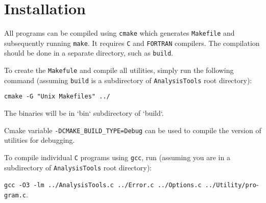 \chapter{Installation} \label{chap:Install}

All programs can be compiled using \texttt{cmake} which generates
\texttt{Makefile} and subsequently running \texttt{make}. It requires
\texttt{C} and \texttt{FORTRAN} compilers.
The compilation should be done in a separate directory, such as
\texttt{build}.

To create the \texttt{Makefule} and compile all utilities,
simply run the following command (assuming \texttt{build} is a subdirectory
of \texttt{AnalysisTools} root directory):

\vspace{1em}
\noindent
\texttt{cmake -G "Unix Makefiles" ../}
\vspace{1em}

The binaries will be in `bin` subdirectory of `build`.

Cmake variable \texttt{-DCMAKE\_BUILD\_TYPE=Debug} can be used to compile
the version of utilities for debugging.

To compile individual \texttt{C} programs using \texttt{gcc}, run (assuming
you are in a subdirectory of \texttt{AnalysisTools} root directory):

\vspace{1em}
\noindent
\texttt{gcc -O3 -lm ../AnalysisTools.c ../Error.c ../Options.c
../Utility/pro}-
\noindent
\texttt{gram.c}.
\vspace{1em}
